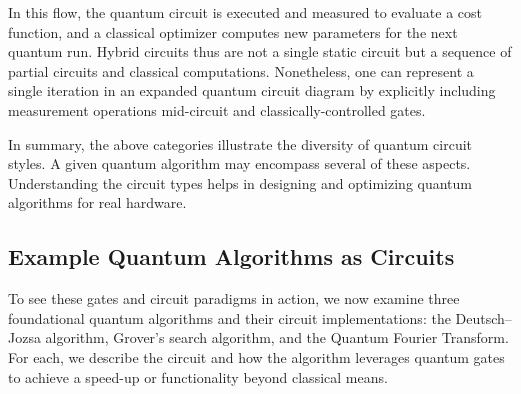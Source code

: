 \begin{center}
\end{center}

\noindent In this flow, the quantum circuit is executed and measured to evaluate a cost function, and a classical optimizer computes new parameters for the next quantum run.\cite{Cerezo2021variational} Hybrid circuits thus are not a single static circuit but a sequence of partial circuits and classical computations.\cite{Preskill2018nisq} Nonetheless, one can represent a single iteration in an expanded quantum circuit diagram by explicitly including measurement operations mid-circuit and classically-controlled gates.\cite{Kelly2015error}

In summary, the above categories illustrate the diversity of quantum circuit styles. A given quantum algorithm may encompass several of these aspects.\cite{Shor1994} Understanding the circuit types helps in designing and optimizing quantum algorithms for real hardware.\cite{Arute2019supremacy}


\subsection{Example Quantum Algorithms as Circuits}

To see these gates and circuit paradigms in action, we now examine three foundational quantum algorithms and their circuit implementations: the Deutsch–Jozsa algorithm, Grover’s search algorithm, and the Quantum Fourier Transform.\cite{NielsenChuang2010} For each, we describe the circuit and how the algorithm leverages quantum gates to achieve a speed-up or functionality beyond classical means.\cite{Preskill2018nisq}

